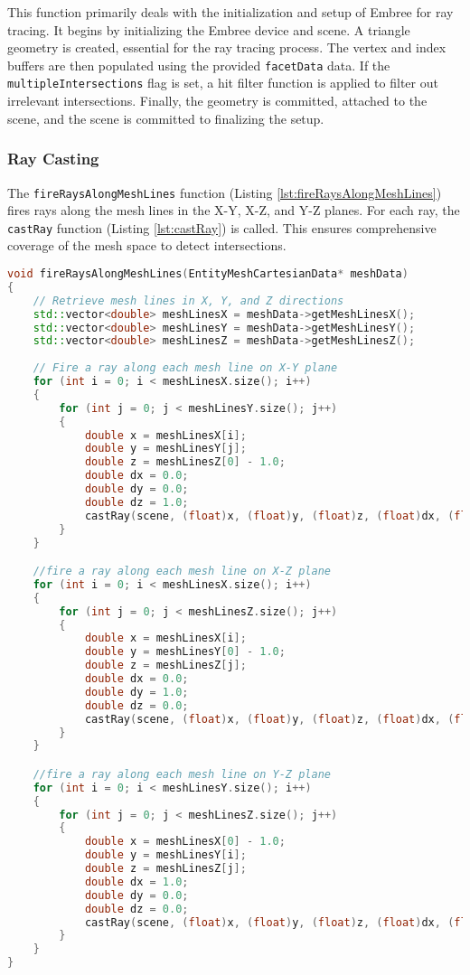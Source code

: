 This function primarily deals with the initialization and setup of Embree for ray tracing. It begins by initializing the Embree device and scene. A triangle geometry is created, essential for the ray tracing process. The vertex and index buffers are then populated using the provided \texttt{facetData} data. If the \texttt{multipleIntersections} flag is set, a hit filter function is applied to filter out irrelevant intersections. Finally, the geometry is committed, attached to the scene, and the scene is committed to finalizing the setup.

\subsubsection{Ray Casting} \label{ray-casting} 
The \texttt{fireRaysAlongMeshLines} function (Listing \ref{lst:fireRaysAlongMeshLines}) fires rays along the mesh lines in the X-Y, X-Z, and Y-Z planes. For each ray, the \texttt{castRay} function (Listing \ref{lst:castRay}) is called. This ensures comprehensive coverage of the mesh space to detect intersections.

\vspace{2mm}
\begin{lstlisting}[language=C++, caption={Firing rays along mesh lines in different planes using the fireRaysAlongMeshLines function.}, label=lst:fireRaysAlongMeshLines] 
void fireRaysAlongMeshLines(EntityMeshCartesianData* meshData)
{
    // Retrieve mesh lines in X, Y, and Z directions
    std::vector<double> meshLinesX = meshData->getMeshLinesX();
    std::vector<double> meshLinesY = meshData->getMeshLinesY();
    std::vector<double> meshLinesZ = meshData->getMeshLinesZ();
    
    // Fire a ray along each mesh line on X-Y plane
    for (int i = 0; i < meshLinesX.size(); i++)
    {
        for (int j = 0; j < meshLinesY.size(); j++)
        {
            double x = meshLinesX[i];
            double y = meshLinesY[j];
            double z = meshLinesZ[0] - 1.0;
            double dx = 0.0;
            double dy = 0.0;
            double dz = 1.0;
            castRay(scene, (float)x, (float)y, (float)z, (float)dx, (float)dy, (float)dz);
        }
    }

    //fire a ray along each mesh line on X-Z plane
    for (int i = 0; i < meshLinesX.size(); i++)
    {
        for (int j = 0; j < meshLinesZ.size(); j++)
        {
            double x = meshLinesX[i];
            double y = meshLinesY[0] - 1.0;
            double z = meshLinesZ[j];
            double dx = 0.0;
            double dy = 1.0;
            double dz = 0.0;
            castRay(scene, (float)x, (float)y, (float)z, (float)dx, (float)dy, (float)dz);
        }
    }

    //fire a ray along each mesh line on Y-Z plane
    for (int i = 0; i < meshLinesY.size(); i++)
    {
        for (int j = 0; j < meshLinesZ.size(); j++)
        {
            double x = meshLinesX[0] - 1.0;
            double y = meshLinesY[i];
            double z = meshLinesZ[j];
            double dx = 1.0;
            double dy = 0.0;
            double dz = 0.0;
            castRay(scene, (float)x, (float)y, (float)z, (float)dx, (float)dy, (float)dz);
        }
    }
}
\end{lstlisting}
    
